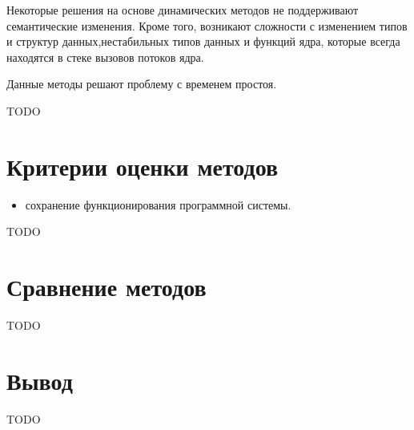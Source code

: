 Некоторые решения на основе динамических методов не поддерживают семантические изменения. Кроме того, возникают сложности с изменением типов и структур данных,нестабильных типов данных и функций ядра, которые всегда находятся в стеке вызовов потоков ядра.

Данные методы решают проблему с временем простоя.

TODO

\section{Критерии оценки методов}

\begin{itemize}
	\item сохранение функционирования программной системы.
\end{itemize}

TODO

\section{Сравнение методов}

TODO

\section{Вывод}

TODO
